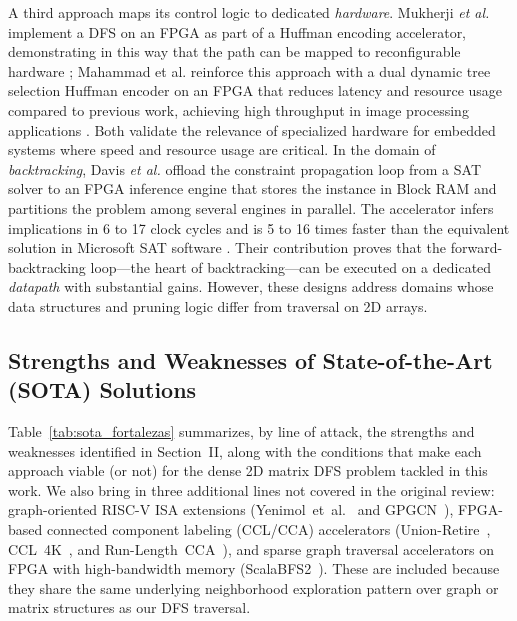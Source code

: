 \documentclass[conference]{IEEEtran}
\begin{document}
A third approach maps its control logic to dedicated \textit{hardware}. Mukherji \textit{et al.} 
implement a DFS on an FPGA as part of a Huffman encoding accelerator, demonstrating in this way that the path can be mapped to reconfigurable hardware
\cite{mukherji2025};  Mahammad et al. reinforce this approach with a dual dynamic tree selection Huffman encoder 
on an FPGA that reduces latency and resource usage compared to previous work, achieving high throughput in image processing applications \cite{article}. 
Both validate the relevance of specialized hardware for embedded systems where speed and resource usage are critical. 
In the domain of \textit{backtracking}, Davis \textit{et al.} offload the constraint propagation 
loop from a SAT solver to an FPGA inference engine that stores the instance in Block RAM and 
partitions the problem among several engines in parallel. The accelerator infers implications
in 6 to 17 clock cycles and is 5 to 16 times faster than the equivalent solution in Microsoft SAT software \cite{microsoftsat}. 
Their contribution proves that the forward-backtracking loop—the heart of backtracking—can be executed on a dedicated
\textit{datapath} with substantial gains. However, these designs address domains whose data structures and pruning logic differ from traversal on 2D arrays.


\subsection{Strengths and Weaknesses of State-of-the-Art (SOTA) Solutions}

Table~\ref{tab:sota_fortalezas} summarizes, by line of attack, the
strengths and weaknesses identified in Section~II, along with the
conditions that make each approach viable (or not) for the dense 2D
matrix DFS problem tackled in this work. We also bring in three
additional lines not covered in the original review: graph-oriented
RISC-V ISA extensions (Yenimol~et~al.~\cite{yenimol2022} and
GPGCN~\cite{tang2022gpgcn}), FPGA-based connected component labeling
(CCL/CCA) accelerators (Union-Retire~\cite{bailey2022unionretire},
CCL~4K~\cite{kowalczyk2021ccl4k}, and
Run-Length~CCA~\cite{appiah2008runlength}), and sparse graph traversal
accelerators on FPGA with high-bandwidth memory
(ScalaBFS2~\cite{li2024scalabfs2}). These are included because they share
the same underlying neighborhood exploration pattern over graph or matrix
structures as our DFS traversal.
\end{document}
